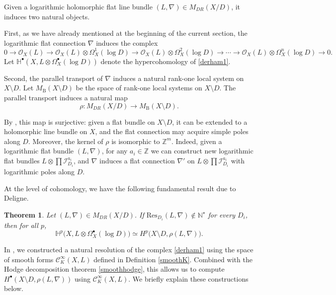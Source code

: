 \documentclass[english]{amsart}
\newcommand{\cC}{\mathcal{C}}
\newcommand{\Res}{\mathrm{Res}}
\newtheorem{thm}{Theorem}[section]
\numberwithin{equation}{thm}
\begin{document}
Given a logarithmic holomorphic flat line bundle $(L,\nabla) \in M_{DR}(X/D)$, it induces two natural objects.

First, as we have already mentioned at the beginning of the current section, the logarithmic flat connection $\nabla$ induces the complex
\begin{equation}\label{derham1}
	0 \to \mathcal{O}_X(L)
	\to \mathcal{O}_X(L) \otimes \Omega_X^{1}(\log D)
	\to \mathcal{O}_X(L) \otimes \Omega_X^{2}(\log D)
	\to \cdots
	\to \mathcal{O}_X(L) \otimes \Omega_X^{n}(\log D)
	\to 0 .
\end{equation}
Let $\mathbb H^\bullet(X, L \otimes \Omega_X^{\bullet}(\log D))$ denote the hypercohomology of \eqref{derham1}.

Second, the parallel transport of $\nabla$ induces a natural rank-one local system on $X \setminus D$.
Let $M_{\mathrm B}(X \setminus D)$ be the space of rank-one local systems on $X \setminus D$.
The parallel transport induces a natural map
\begin{equation}\label{surjj}
	\rho : M_{DR}(X/D) \longrightarrow M_{\mathrm B}(X \setminus D).
\end{equation}

By \cite[II, 6.10]{Del70}, this map is surjective: given a flat bundle on $X \setminus D$, it can be extended to a holomorphic line bundle on $X$, and the flat connection may acquire simple poles along $D$.
Moreover, the kernel of $\rho$ is isomorphic to $\mathbb Z^m$.
Indeed, given a logarithmic flat bundle $(L,\nabla)$, for any $a_i \in \mathbb Z$ we can construct new logarithmic flat bundles
$L \otimes \prod \mathcal{I}_{D_i}^{a_i}$, and $\nabla$ induces a flat connection $\nabla'$ on
$L \otimes \prod \mathcal{I}_{D_i}^{a_i}$ with logarithmic poles along $D$.

At the level of cohomology, we have the following fundamental result due to Deligne.

\begin{thm}\cite[II, 6.10]{Del70}\label{Deli}
	Let $(L,\nabla) \in M_{DR}(X/D)$.
	If $\Res_{D_i}(L,\nabla) \notin \mathbb N^\star$ for every $D_i$, then for all $p$,
	\[
	\mathbb H^p\bigl(X, L \otimes \Omega_X^{\bullet}(\log D)\bigr)
	\simeq
	H^p\bigl(X \setminus D, \rho(L,\nabla)\bigr).
	\]
\end{thm}
\medskip

In \cite{CDHP}, we constructed a natural resolution of the complex \eqref{derham1} using the space of smooth forms $\cC^\infty_K(X,L)$ defined in Definition \ref{smoothK}.
Combined with the Hodge decomposition theorem \ref{smoothhodge}, this allows us to compute
$H^\bullet(X \setminus D, \rho(L,\nabla))$ using $\cC^\infty_K(X,L)$.
We briefly explain these constructions below.
\end{document}
